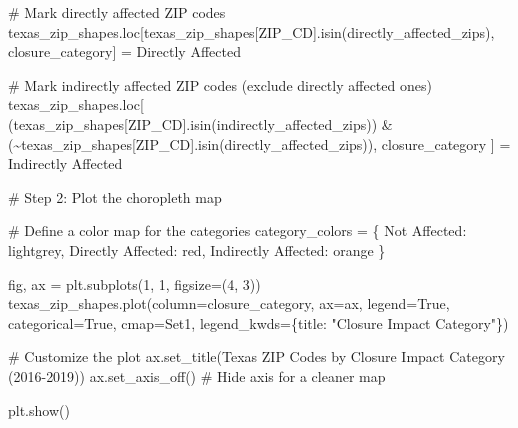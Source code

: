 \documentclass[
  letterpaper,
  DIV=11,
  numbers=noendperiod]{scrartcl}
\newenvironment{Shaded}{\begin{snugshade}}{\end{snugshade}}
\newcommand{\CommentTok}[1]{\textcolor[rgb]{0.37,0.37,0.37}{#1}}
\newcommand{\DecValTok}[1]{\textcolor[rgb]{0.68,0.00,0.00}{#1}}
\newcommand{\NormalTok}[1]{\textcolor[rgb]{0.00,0.23,0.31}{#1}}
\newcommand{\OperatorTok}[1]{\textcolor[rgb]{0.37,0.37,0.37}{#1}}
\newcommand{\StringTok}[1]{\textcolor[rgb]{0.13,0.47,0.30}{#1}}
\newcommand{\VariableTok}[1]{\textcolor[rgb]{0.07,0.07,0.07}{#1}}
\begin{document}
\begin{Shaded}
\begin{Highlighting}[]
\CommentTok{\# Mark directly affected ZIP codes}
\NormalTok{texas\_zip\_shapes.loc[texas\_zip\_shapes[}\StringTok{\textquotesingle{}ZIP\_CD\textquotesingle{}}\NormalTok{].isin(directly\_affected\_zips), }\StringTok{\textquotesingle{}closure\_category\textquotesingle{}}\NormalTok{] }\OperatorTok{=} \StringTok{\textquotesingle{}Directly Affected\textquotesingle{}}

\CommentTok{\# Mark indirectly affected ZIP codes (exclude directly affected ones)}
\NormalTok{texas\_zip\_shapes.loc[}
\NormalTok{    (texas\_zip\_shapes[}\StringTok{\textquotesingle{}ZIP\_CD\textquotesingle{}}\NormalTok{].isin(indirectly\_affected\_zips)) }\OperatorTok{\&} 
\NormalTok{    (}\OperatorTok{\textasciitilde{}}\NormalTok{texas\_zip\_shapes[}\StringTok{\textquotesingle{}ZIP\_CD\textquotesingle{}}\NormalTok{].isin(directly\_affected\_zips)), }
    \StringTok{\textquotesingle{}closure\_category\textquotesingle{}}
\NormalTok{] }\OperatorTok{=} \StringTok{\textquotesingle{}Indirectly Affected\textquotesingle{}}

\CommentTok{\# Step 2: Plot the choropleth map}

\CommentTok{\# Define a color map for the categories}
\NormalTok{category\_colors }\OperatorTok{=}\NormalTok{ \{}
    \StringTok{\textquotesingle{}Not Affected\textquotesingle{}}\NormalTok{: }\StringTok{\textquotesingle{}lightgrey\textquotesingle{}}\NormalTok{,}
    \StringTok{\textquotesingle{}Directly Affected\textquotesingle{}}\NormalTok{: }\StringTok{\textquotesingle{}red\textquotesingle{}}\NormalTok{,}
    \StringTok{\textquotesingle{}Indirectly Affected\textquotesingle{}}\NormalTok{: }\StringTok{\textquotesingle{}orange\textquotesingle{}}
\NormalTok{\}}

\NormalTok{fig, ax }\OperatorTok{=}\NormalTok{ plt.subplots(}\DecValTok{1}\NormalTok{, }\DecValTok{1}\NormalTok{, figsize}\OperatorTok{=}\NormalTok{(}\DecValTok{4}\NormalTok{, }\DecValTok{3}\NormalTok{))}
\NormalTok{texas\_zip\_shapes.plot(column}\OperatorTok{=}\StringTok{\textquotesingle{}closure\_category\textquotesingle{}}\NormalTok{, }
\NormalTok{                      ax}\OperatorTok{=}\NormalTok{ax, }
\NormalTok{                      legend}\OperatorTok{=}\VariableTok{True}\NormalTok{,}
\NormalTok{                      categorical}\OperatorTok{=}\VariableTok{True}\NormalTok{,}
\NormalTok{                      cmap}\OperatorTok{=}\StringTok{\textquotesingle{}Set1\textquotesingle{}}\NormalTok{,}
\NormalTok{                      legend\_kwds}\OperatorTok{=}\NormalTok{\{}\StringTok{\textquotesingle{}title\textquotesingle{}}\NormalTok{: }\StringTok{"Closure Impact Category"}\NormalTok{\})}

\CommentTok{\# Customize the plot}
\NormalTok{ax.set\_title(}\StringTok{\textquotesingle{}Texas ZIP Codes by Closure Impact Category (2016{-}2019)\textquotesingle{}}\NormalTok{)}
\NormalTok{ax.set\_axis\_off()  }\CommentTok{\# Hide axis for a cleaner map}

\NormalTok{plt.show()}
\end{Highlighting}
\end{Shaded}
\end{document}
